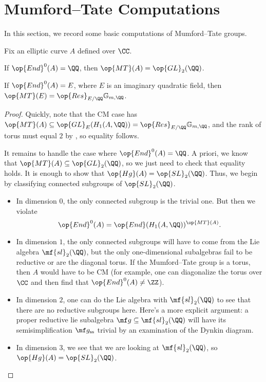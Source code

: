 \documentclass{article}
\begin{document}
\section{Mumford--Tate Computations}
In this section, we record some basic computations of Mumford--Tate groups.
\begin{example}
	Fix an elliptic curve $A$ defined over $\CC$.
	\begin{listalph}
		\item If $\op{End}^0(A)=\QQ$, then $\op{MT}(A)=\op{GL}_2(\QQ)$.
		\item If $\op{End}^0(A)=E$, where $E$ is an imaginary quadratic field, then $\op{MT}(E)=\op{Res}_{E/\QQ}\mathbb G_{m,\QQ}$.
	\end{listalph}
\end{example}
\begin{proof}
	Quickly, note that the CM case has $\op{MT}(A)\subseteq\op{GL}_E(H_1(A,\QQ))=\op{Res}_{E/\QQ}\mathbb G_{m,\QQ}$, and the rank of torus must equal $2$ by , so equality follows.

	It remains to handle the case where $\op{End}^0(A)=\QQ$. A priori, we know that $\op{MT}(A)\subseteq\op{GL}_2(\QQ)$, so we just need to check that equality holds. It is enough to show that $\op{Hg}(A)=\op{SL}_2(\QQ)$. Thus, we begin by classifying connected subgroups of $\op{SL}_2(\QQ)$.
	\begin{itemize}
		\item In dimension $0$, the only connected subgroup is the trivial one. But then we violate
		\[\op{End}^0(A)=\op{End}(H_1(A,\QQ))^{\op{MT}(A)}.\]
		\item In dimension $1$, the only connected subgroups will have to come from the Lie algebra $\mf{sl}_2(\QQ)$, but the only one-dimensional subalgebras fail to be reductive or are the diagonal torus. If the Mumford--Tate group is a torus, then $A$ would have to be CM (for example, one can diagonalize the torus over $\CC$ and then find that $\op{End}^0(A)\ne\ZZ$).
		\item In dimension $2$, one can do the Lie algebra with $\mf{sl}_2(\QQ)$ to see that there are no reductive subgroups here. Here's a more explicit argument: a proper reductive lie subalgebra $\mf g\subseteq\mf{sl}_2(\QQ)$ will have its semisimplification $\mf g_{\mathrm{ss}}$ trivial by an examination of the Dynkin diagram.
		\item In dimension $3$, we see that we are looking at $\mf{sl}_2(\QQ)$, so $\op{Hg}(A)=\op{SL}_2(\QQ)$.
		\qedhere
	\end{itemize}
\end{proof}
\end{document}
